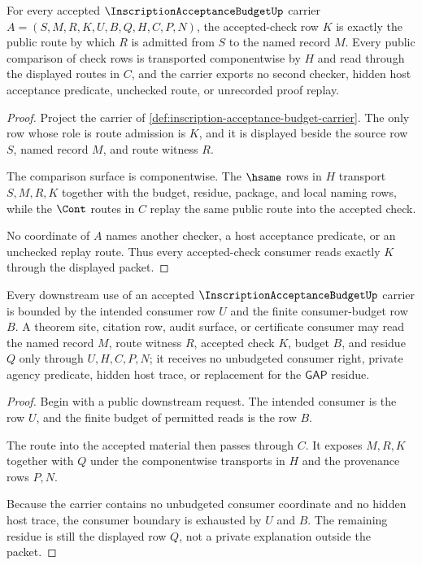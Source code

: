 \begin{theorem}
\label{thm:inscription-acceptance-budget-check-row-exactness}
For every accepted $\InscriptionAcceptanceBudgetUp$ carrier $A=(S,M,R,K,U,B,Q,H,C,P,N)$, the accepted-check row $K$ is exactly the public route by which $R$ is admitted from $S$ to the named record $M$. Every public comparison of check rows is transported componentwise by $H$ and read through the displayed routes in $C$, and the carrier exports no second checker, hidden host acceptance predicate, unchecked route, or unrecorded proof replay.
\end{theorem}
\begin{proof}
Project the carrier of \autoref{def:inscription-acceptance-budget-carrier}. The only row whose role is route admission is $K$, and it is displayed beside the source row $S$, named record $M$, and route witness $R$.

The comparison surface is componentwise. The $\hsame$ rows in $H$ transport $S,M,R,K$ together with the budget, residue, package, and local naming rows, while the $\Cont$ routes in $C$ replay the same public route into the accepted check.

No coordinate of $A$ names another checker, a host acceptance predicate, or an unchecked replay route. Thus every accepted-check consumer reads exactly $K$ through the displayed packet.
\end{proof}

\begin{theorem}
\label{thm:inscription-acceptance-budget-consumer-boundary}
Every downstream use of an accepted $\InscriptionAcceptanceBudgetUp$ carrier is bounded by the intended consumer row $U$ and the finite consumer-budget row $B$. A theorem site, citation row, audit surface, or certificate consumer may read the named record $M$, route witness $R$, accepted check $K$, budget $B$, and residue $Q$ only through $U,H,C,P,N$; it receives no unbudgeted consumer right, private agency predicate, hidden host trace, or replacement for the $\mathsf{GAP}$ residue.
\end{theorem}
\begin{proof}
Begin with a public downstream request. The intended consumer is the row $U$, and the finite budget of permitted reads is the row $B$.

The route into the accepted material then passes through $C$. It exposes $M,R,K$ together with $Q$ under the componentwise transports in $H$ and the provenance rows $P,N$.

Because the carrier contains no unbudgeted consumer coordinate and no hidden host trace, the consumer boundary is exhausted by $U$ and $B$. The remaining residue is still the displayed row $Q$, not a private explanation outside the packet.
\end{proof}

